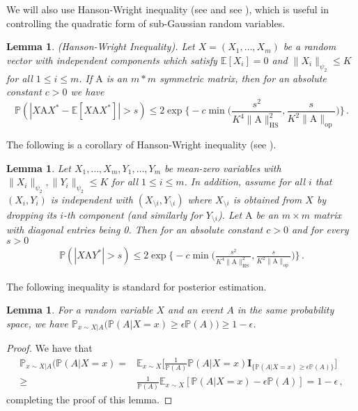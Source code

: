 \documentclass[11pt]{article}
\newtheorem{Lemma}[Theorem]{Lemma}
\numberwithin{equation}{section}
\begin{document}
We will also use Hanson-Wright inequality (see \cite{HW71, Wright73, FR13} and see \cite[Theorem 1.1]{RV14}), which is useful in controlling the quadratic form of sub-Gaussian random variables.
\begin{Lemma}{\label{lemma-Hanson-Wright}}
    \textup{(Hanson-Wright Inequality)}. Let $X=(X_1,\ldots,X_m)$ be a random vector with independent components which satisfy  $\mathbb{E}[X_i]=0$ and  $\| X_i \|_{\psi_2} \leq K$ for all $1\leq i\leq m$. If $\mathrm{A}$ is an $m*m$ symmetric matrix, then for an absolute constant $c>0$ we have
    \begin{equation}
        \mathbb{P} ( |X \mathrm{A} X^{*} - \mathbb{E}[X \mathrm{A} X^{*} ] | > s ) \leq 2 \exp \Big\{  -c \min \Big( \frac{s^2}{ K^4 \| \mathrm{A} \|^2_{\mathrm{HS}}}, \frac{s}{ K^2 \| \mathrm{A} \|_{\mathrm{op}}} \Big) \Big\}\,.
        \label{equ_Hanson_Wright_tail}
    \end{equation}
\end{Lemma}

The following is a corollary of Hanson-Wright inequality (see
 \cite[Lemma 3.8]{DL22+}).
 \begin{Lemma} {\label{lemma-modify-Hanson-Wright}}
    Let $X_1,\ldots,X_m,Y_1,\ldots,Y_m$ be mean-zero variables with $\| X_i \|_{\psi_2}, \| Y_i \|_{\psi_2} \leq K$ for all $1\leq i\leq m$. In addition, assume for all $i$ that $(X_i, Y_i)$ is independent with $(X_{\setminus i}, Y_{\setminus i})$ where $X_{\setminus i}$ is obtained from $X$ by dropping its $i$-th component (and similarly for $Y_{\setminus i}$). Let $\mathrm{A}$ be an $m \times m$ matrix with diagonal entries being 0. Then for an absolute constant $c>0$ and for every $s > 0$ 
    \begin{align*}
        \mathbb{P} ( | X \mathrm{A} Y^{*} | > s ) \leq 2 \exp \Big \{  -c \min \Big(  \frac{s^2}{K^4 \| \mathrm{A} \|^2_{\mathrm{HS}}}, \frac{ s }{ K^2 \| \mathrm{A} \|_{\mathrm{op}} } \Big)  \Big \}\,.
    \end{align*}
\end{Lemma}
The following inequality is standard for posterior estimation.
\begin{Lemma} {\label{lemma-posterior-estimator}}
For a random variable $X$ and an event $A$ in the same probability space, we have $\mathbb{P}_{x \sim X|A} \big( \mathbb{P}(A|X=x) \geq \epsilon \mathbb{P}(A) \big) \geq 1-\epsilon$.
\end{Lemma}
\begin{proof}
We have that
\begin{align*}
   \mathbb{P}_{x \sim X|A} \big( \mathbb{P}(A|X=x) = & \mathbb{E}_{x \sim X} \Big[ \frac{1}{\mathbb{P}(A)} \mathbb{P}(A|X=x) \mathbf{I}_{ \{ \mathbb{P}(A|X=x) \geq \epsilon \mathbb{P}(A) \} } \Big]  \\
    \geq & \frac{1}{\mathbb{P}(A)} \mathbb{E}_{x \sim X} [ \mathbb{P}(A|X=x) - \epsilon \mathbb{P}(A) ] = 1 - \epsilon \,,  
\end{align*} 
completing the proof of this lemma.
\end{proof}
\end{document}
